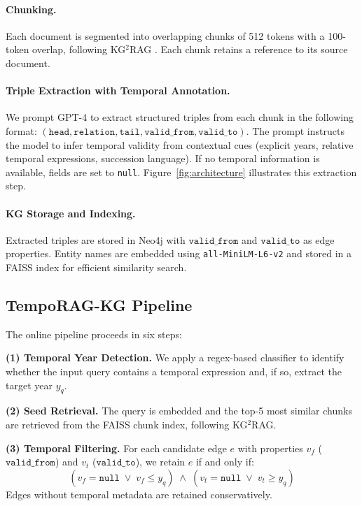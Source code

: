 \documentclass[11pt]{article}
\begin{document}
\paragraph{Chunking.}
Each document is segmented into overlapping chunks of 512 tokens with a
100-token overlap, following KG$^2$RAG \cite{zhu2025kg2rag}. Each chunk
retains a reference to its source document.

\paragraph{Triple Extraction with Temporal Annotation.}
We prompt GPT-4 to extract structured triples from each chunk in the
following format: $(\mathtt{head}, \mathtt{relation}, \mathtt{tail},
\mathtt{valid\_from}, \mathtt{valid\_to})$. The prompt instructs the model
to infer temporal validity from contextual cues (explicit years, relative
temporal expressions, succession language). If no temporal information is
available, fields are set to \texttt{null}. Figure~\ref{fig:architecture}
illustrates this extraction step.

\paragraph{KG Storage and Indexing.}
Extracted triples are stored in Neo4j with $\mathtt{valid\_from}$ and
$\mathtt{valid\_to}$ as edge properties. Entity names are embedded using
\texttt{all-MiniLM-L6-v2} \cite{reimers2019sentencebert} and stored in a
FAISS index for efficient similarity search.

\subsection{TempoRAG-KG Pipeline}

The online pipeline proceeds in six steps:

\textbf{(1) Temporal Year Detection.}
We apply a regex-based classifier to identify whether the input query
contains a temporal expression and, if so, extract the target year
$y_q$.

\textbf{(2) Seed Retrieval.}
The query is embedded and the top-5 most similar chunks are retrieved
from the FAISS chunk index, following KG$^2$RAG.

\textbf{(3) Temporal Filtering.}
For each candidate edge $e$ with properties $v_f$ ($\mathtt{valid\_from}$)
and $v_t$ ($\mathtt{valid\_to}$), we retain $e$ if and only if:
\begin{equation}
  (v_f = \texttt{null} \;\lor\; v_f \leq y_q) \;\land\;
  (v_t = \texttt{null} \;\lor\; v_t \geq y_q)
  \label{eq:filter}
\end{equation}
Edges without temporal metadata are retained conservatively.
\end{document}
